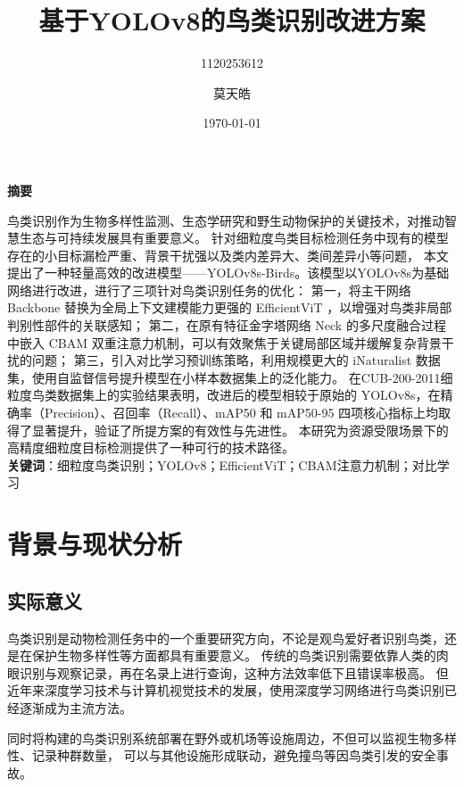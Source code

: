 \documentclass[12pt]{ctexart}
\begin{document}
\title{基于YOLOv8的鸟类识别改进方案} 
\author{1120253612 \and 莫天皓}
\date{\today} 
\maketitle 

\begin{center}
  {\Large \textbf{摘\quad 要}}
\end{center}
\vspace{1em}
鸟类识别作为生物多样性监测、生态学研究和野生动物保护的关键技术，对推动智慧生态与可持续发展具有重要意义。
针对细粒度鸟类目标检测任务中现有的模型存在的小目标漏检严重、背景干扰强以及类内差异大、类间差异小等问题，
本文提出了一种轻量高效的改进模型——YOLOv8s-Birds。该模型以YOLOv8s为基础网络进行改进，进行了三项针对鸟类识别任务的优化：
第一，将主干网络 Backbone 替换为全局上下文建模能力更强的 EfficientViT\cite{ref6} ，以增强对鸟类非局部判别性部件的关联感知；
第二，在原有特征金字塔网络 Neck 的多尺度融合过程中嵌入 CBAM\cite{ref7} 双重注意力机制，可以有效聚焦于关键局部区域并缓解复杂背景干扰的问题；
第三，引入对比学习预训练策略\cite{ref12}，利用规模更大的 iNaturalist 数据集\cite{ref11}，使用自监督信号提升模型在小样本数据集上的泛化能力。
在CUB-200-2011细粒度鸟类数据集上的实验结果表明，改进后的模型相较于原始的 YOLOv8s，在精确率（Precision）、召回率（Recall）、mAP50 和 mAP50-95 四项核心指标上均取得了显著提升，验证了所提方案的有效性与先进性。
本研究为资源受限场景下的高精度细粒度目标检测提供了一种可行的技术路径。\\
\noindent \textbf{关键词}：细粒度鸟类识别；YOLOv8；EfficientViT；CBAM注意力机制；对比学习

\newpage



\section{背景与现状分析}

\subsection{实际意义}
鸟类识别是动物检测任务中的一个重要研究方向，不论是观鸟爱好者识别鸟类，还是在保护生物多样性等方面都具有重要意义。
传统的鸟类识别需要依靠人类的肉眼识别与观察记录，再在名录上进行查询，这种方法效率低下且错误率极高。
但近年来深度学习技术与计算机视觉技术的发展，使用深度学习网络进行鸟类识别已经逐渐成为主流方法。

同时将构建的鸟类识别系统部署在野外或机场等设施周边，不但可以监视生物多样性、记录种群数量，
可以与其他设施形成联动，避免撞鸟等因鸟类引发的安全事故。
\end{document}
